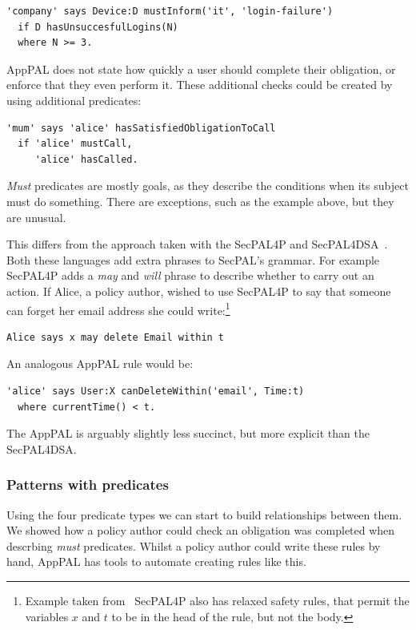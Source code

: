 \documentclass[thesis.tex]{subfiles}
\begin{document}
\begin{description}
  \begin{lstlisting}
'company' says Device:D mustInform('it', 'login-failure')
  if D hasUnsuccesfulLogins(N)
  where N >= 3.
  \end{lstlisting}

  AppPAL does not state how quickly a user should complete their obligation, or
  enforce that they even perform it.  These additional checks could be created
  by using additional predicates:

  \begin{lstlisting}
'mum' says 'alice' hasSatisfiedObligationToCall
  if 'alice' mustCall,
     'alice' hasCalled.
  \end{lstlisting}

  \emph{Must} predicates are mostly goals, as they describe the conditions when
  its subject must do something.  There are exceptions, such as the example
  above, but they are unusual.
\end{description}


This differs from the approach taken with the SecPAL4P and SecPAL4DSA~\cite{becker_framework_2009,aziz_secpal4dsa:_2011}.
Both these languages add extra phrases to SecPAL's grammar.
For example SecPAL4P adds a \emph{may} and \emph{will} phrase to describe whether to carry out an action.
If Alice, a policy author, wished to use SecPAL4P to say that someone can forget her email address she could write:\footnote{%
Example taken from~\cite{becker_framework_2009}  SecPAL4P also has relaxed safety rules, that permit the variables $x$ and $t$ to be in the head of the rule, but not the body.}
\begin{lstlisting}
Alice says x may delete Email within t
\end{lstlisting}
An analogous AppPAL rule would be:
\begin{lstlisting}
'alice' says User:X canDeleteWithin('email', Time:t)
  where currentTime() < t.
\end{lstlisting}
The AppPAL is arguably slightly less succinct, but more explicit than the SecPAL4DSA.

\subsubsection{Patterns with predicates}

Using the four predicate types we can start to build relationships between them.
We showed how a policy author could check an obligation was completed when
descrbing \emph{must} predicates.  Whilst a policy author could write these
rules by hand, AppPAL has tools to automate creating rules like this.
\end{document}
